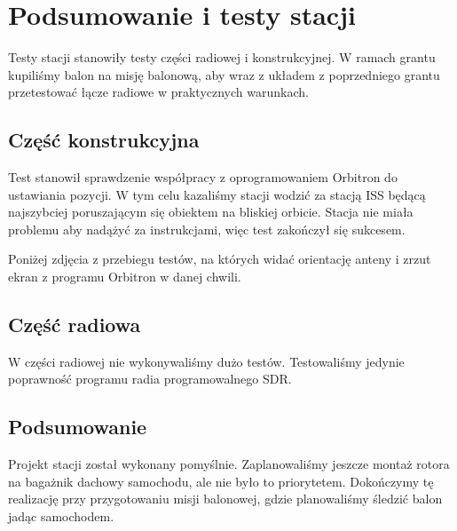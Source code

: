 \section{Podsumowanie i testy stacji}

Testy stacji stanowiły testy części radiowej i konstrukcyjnej. W ramach grantu kupiliśmy balon na misję balonową, aby wraz z układem z poprzedniego grantu przetestować łącze radiowe w praktycznych warunkach.

\subsection{Część konstrukcyjna}

Test stanowił sprawdzenie współpracy z oprogramowaniem Orbitron do ustawiania pozycji. W tym celu kazaliśmy stacji wodzić za stacją ISS będącą najszybciej poruszającym się obiektem na bliskiej orbicie. Stacja nie miała problemu aby nadążyć za instrukcjami, więc test zakończył się sukcesem.



Poniżej zdjęcia z przebiegu testów, na których widać orientację anteny i zrzut ekran z programu Orbitron w danej chwili.



\subsection{Część radiowa}

W części radiowej nie wykonywaliśmy dużo testów. Testowaliśmy jedynie poprawność programu radia programowalnego SDR.

\subsection{Podsumowanie}

Projekt stacji został wykonany pomyślnie. Zaplanowaliśmy jeszcze montaż rotora na bagażnik dachowy samochodu, ale nie było to priorytetem. Dokończymy tę realizację przy przygotowaniu misji balonowej, gdzie planowaliśmy śledzić balon jadąc samochodem.
